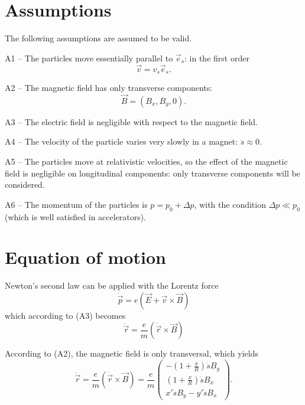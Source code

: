 \section{Assumptions}
The following assumptions are assumed to be valid.
\begin{description}
    \item{A1 --} The particles move essentially parallel to $\vec{e}_s$: in the first order
    \begin{equation*}
        \vec{v} = v_s \vec{e}_s.
    \end{equation*}
    \item{A2 --} The magnetic field has only transverse components:
        \begin{equation*}
        \vec{B} = (B_x, B_y, 0).
        \end{equation*}
    \item{A3 --} The electric field is negligible with respect to the magnetic field.
    \item{A4 --} The velocity of the particle varies very slowly in a magnet: $\ddot{s} \approx 0$.
    \item{A5 --} The particles move at relativistic velocities, so the effect of the magnetic field is negligible on longitudinal components: only transverse components will be considered.
    \item{A6 --} The momentum of the particles is $p = p_0+\Delta p$, with the condition $\Delta p \ll p_0$ (which is well satisfied in accelerators).
\end{description}

\section{Equation of motion}
\label{sec:eq_motion}
Newton's second law can be applied with the Lorentz force
\begin{equation}
\dot{\vec{p}} = e(\vec{E}+\vec{v} \times \vec{B}) 
\end{equation}
which according to (A3) becomes
\begin{equation}
\ddot{\vec{r}} = \frac{e}{m}(\dot{\vec{r}} \times \vec{B})
\end{equation}

According to (A2), the magnetic field is only transversal, which yields
\begin{equation}
\label{eq:lorentz_transv}
\ddot{\vec{r}} = \frac{e}{m}(\dot{\vec{r}} \times \vec{B})
= \frac{e}{m}
    \begin{pmatrix}
        -\left(1+\frac{x}{R}\right)\dot{s}B_y \\
        \left(1+\frac{x}{R}\right)\dot{s}B_x \\
        x'\dot{s}B_y - y'\dot{s}B_x
    \end{pmatrix}.
\end{equation}

